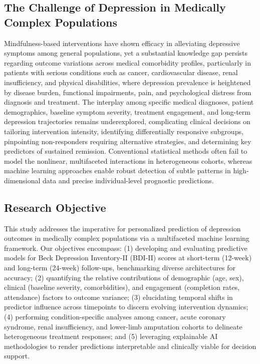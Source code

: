 \documentclass[conference]{IEEEtran}
\begin{document}
\subsection{The Challenge of Depression in Medically Complex Populations}

Mindfulness-based interventions have shown efficacy in alleviating depressive symptoms among general populations, yet a substantial knowledge gap persists regarding outcome variations across medical comorbidity profiles, particularly in patients with serious conditions such as cancer, cardiovascular disease, renal insufficiency, and physical disabilities, where depression prevalence is heightened by disease burden, functional impairments, pain, and psychological distress from diagnosis and treatment. The interplay among specific medical diagnoses, patient demographics, baseline symptom severity, treatment engagement, and long-term depression trajectories remains underexplored, complicating clinical decisions on tailoring intervention intensity, identifying differentially responsive subgroups, pinpointing non-responders requiring alternative strategies, and determining key predictors of sustained remission. Conventional statistical methods often fail to model the nonlinear, multifaceted interactions in heterogeneous cohorts, whereas machine learning approaches enable robust detection of subtle patterns in high-dimensional data and precise individual-level prognostic predictions.

\subsection{Research Objective}
This study addresses the imperative for personalized prediction of depression outcomes in medically complex populations via a multifaceted machine learning framework. Our objectives encompass: (1) developing and evaluating predictive models for Beck Depression Inventory-II (BDI-II) scores at short-term (12-week) and long-term (24-week) follow-ups, benchmarking diverse architectures for accuracy; (2) quantifying the relative contributions of demographic (age, sex), clinical (baseline severity, comorbidities), and engagement (completion rates, attendance) factors to outcome variance; (3) elucidating temporal shifts in predictor influence across timepoints to discern evolving intervention dynamics; (4) performing condition-specific analyses among cancer, acute coronary syndrome, renal insufficiency, and lower-limb amputation cohorts to delineate heterogeneous treatment responses; and (5) leveraging explainable AI methodologies to render predictions interpretable and clinically viable for decision support.
\end{document}
